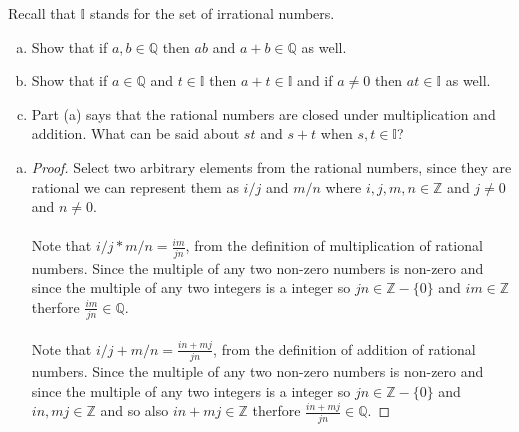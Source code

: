 \documentclass[12pt]{article}
\makeatletter
\theoremstyle{homework}
\newenvironment{exercise}[1]
{\def\@currentlabel{#1}\exercisecore}
{\endexercisecore}
\newcommand{\Rats}{\ensuremath{\mathbb Q}}
\makeatother
\begin{document}
\begin{exercise}{1.4.1}
Recall that $\mathbb{I}$ stands for the set of irrational numbers.
\begin{enumerate}[(a)]
\item Show that if $a,b\in\Rats$ then $ab$ and $a+b\in\Rats$ as well.
\item Show that if $a\in\Rats$ and $t\in\mathbb{I}$ then $a+t\in\mathbb{I}$ and if $a\neq 0$ then $at\in\mathbb{I}$ as well.
\item Part (a) says that the rational numbers are closed under multiplication
and addition.  What can be said about $st$ and $s+t$ when $s,t\in\mathbb{I}$?
\end{enumerate}
\end{exercise}
\begin{enumerate}[(a)]
\item \begin{proof}
Select two arbitrary elements from the rational numbers, since they are rational we can represent them as $i/j$ and $m/n$ where $i,j,m,n\in \mathbb{Z}$ and $j\neq 0$ and $n\neq 0$.\\\\
Note that $i/j*m/n=\frac{im}{jn}$, from the definition of multiplication of rational numbers.  Since the multiple of any two non-zero numbers is non-zero and since the multiple of any two integers is a integer so $jn\in \mathbb{Z}-\{0\}$ and $im\in \mathbb{Z}$ therfore $\frac{im}{jn}\in \mathbb{Q}$.\\\\
Note that $i/j+m/n=\frac{in+mj}{jn}$, from the definition of addition of rational numbers.  Since the multiple of any two non-zero numbers is non-zero and since the multiple of any two integers is a integer so $jn\in \mathbb{Z}-\{0\}$ and $in,mj\in \mathbb{Z}$ and so also $in+mj \in \mathbb{Z}$ therfore $\frac{in+mj}{jn}\in \mathbb{Q}$.
\end{proof}


\end{enumerate}
\end{document}
